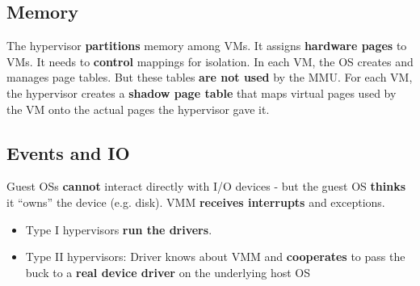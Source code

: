 \documentclass{article}
\begin{document}
\subsection{Memory}
\begin{flushleft}
The hypervisor \textbf{partitions} memory among VMs. It assigns \textbf{hardware pages} to VMs. It needs to \textbf{control} mappings for isolation. In each VM, the OS creates and manages page tables. But these tables \textbf{are not used} by the MMU. For each VM, the hypervisor creates a \textbf{shadow page table} that maps virtual pages used by the VM onto the actual pages the hypervisor gave it.
\end{flushleft}

\subsection{Events and IO}
\begin{flushleft}
Guest OSs \textbf{cannot} interact directly with I/O devices - but the guest OS \textbf{thinks} it “owns” the device (e.g. disk). VMM \textbf{receives interrupts} and exceptions.
\begin{itemize}
	\item Type I hypervisors \textbf{run the drivers}.
	\item Type II hypervisors: Driver knows about VMM and \textbf{cooperates} to pass the buck to a \textbf{real device driver} on the underlying host OS
\end{itemize}
\end{flushleft}
\end{document}
